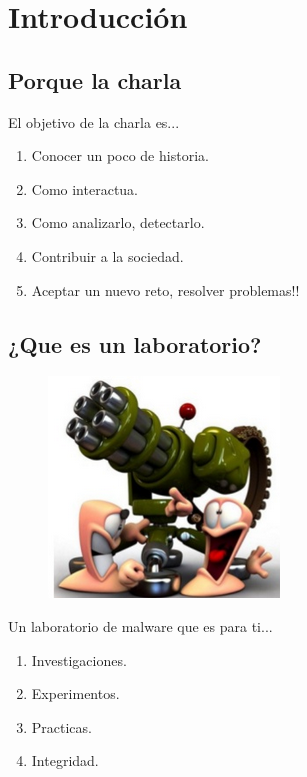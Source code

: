 \documentclass[12pt]{beamer} %
\begin{document}
\section{Introducción}

\subsection{Porque la charla}
\begin{slide}
 
  El objetivo de la charla es...\pause
  \begin{enumerate}
  \item Conocer un poco de historia.\pause
  \item Como interactua.\pause
  \item Como analizarlo, detectarlo.\pause
  \item Contribuir a la sociedad.\pause
  \item Aceptar un nuevo reto, resolver problemas!!
  \end{enumerate}
\end{slide}

\subsection{¿Que es un laboratorio?}

\begin{slide}
    \begin{figure}[h]
      \includegraphics[height=0.4\textheight]{img/Worms.png}
    \end{figure}
  Un laboratorio de malware que es para ti...\pause
  \begin{enumerate}
  \item Investigaciones.\pause
  \item Experimentos.\pause
  \item Practicas.\pause
  \item Integridad.
  \end{enumerate}
\end{slide}
\end{document}
